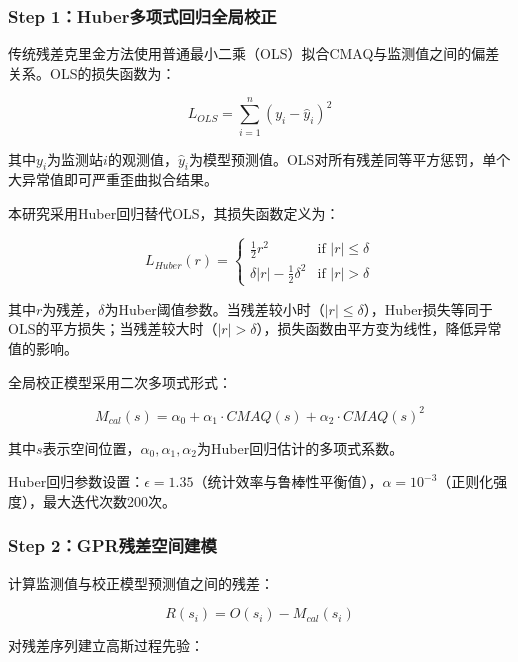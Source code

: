 \documentclass[UTF8, a4paper, 12pt]{article}
\begin{document}
\subsubsection{Step 1：Huber多项式回归全局校正}

传统残差克里金方法使用普通最小二乘（OLS）拟合CMAQ与监测值之间的偏差关系。OLS的损失函数为：

\begin{equation}
L_{OLS} = \sum_{i=1}^{n} (y_i - \hat{y}_i)^2
\end{equation}

其中$y_i$为监测站$i$的观测值，$\hat{y}_i$为模型预测值。OLS对所有残差同等平方惩罚，单个大异常值即可严重歪曲拟合结果。

本研究采用Huber回归替代OLS，其损失函数定义为：

\begin{equation}
L_{Huber}(r) =
\begin{cases}
\frac{1}{2} r^2 & \text{if } |r| \leq \delta \\
\delta |r| - \frac{1}{2} \delta^2 & \text{if } |r| > \delta
\end{cases}
\end{equation}

其中$r$为残差，$\delta$为Huber阈值参数。当残差较小时（$|r| \leq \delta$），Huber损失等同于OLS的平方损失；当残差较大时（$|r| > \delta$），损失函数由平方变为线性，降低异常值的影响。

全局校正模型采用二次多项式形式：

\begin{equation}
M_{cal}(s) = \alpha_0 + \alpha_1 \cdot CMAQ(s) + \alpha_2 \cdot CMAQ(s)^2
\end{equation}

其中$s$表示空间位置，$\alpha_0, \alpha_1, \alpha_2$为Huber回归估计的多项式系数。

Huber回归参数设置：$\epsilon=1.35$（统计效率与鲁棒性平衡值），$\alpha=10^{-3}$（正则化强度），最大迭代次数200次。

\subsubsection{Step 2：GPR残差空间建模}

计算监测值与校正模型预测值之间的残差：

\begin{equation}
R(s_i) = O(s_i) - M_{cal}(s_i)
\end{equation}

对残差序列建立高斯过程先验：
\end{document}
